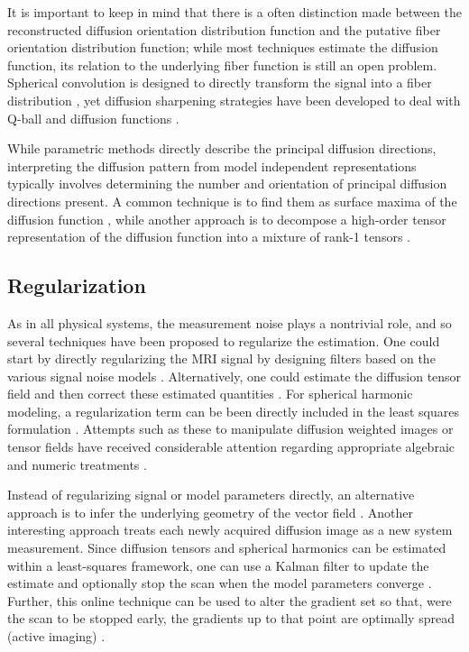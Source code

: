 \documentclass[final,hyperref]{gatech-thesis}
\begin{document}
It is important to keep in mind that there is a often distinction made between
the reconstructed diffusion orientation distribution function and the putative
fiber orientation distribution function; while most techniques estimate the
diffusion function, its relation to the underlying fiber function is still an
open problem.  Spherical convolution is designed to directly transform the
signal into a fiber distribution
\cite{Alexander2005ipmi,Jansons2003,Anderson2005,Tournier2004}, yet diffusion
sharpening strategies have been developed to deal with Q-ball and diffusion
functions \cite{Descoteaux2009tmi}.

While parametric methods directly describe the principal diffusion directions,
interpreting the diffusion pattern from model independent representations
typically involves determining the number and orientation of principal
diffusion directions present.  A common technique is to find them as surface
maxima of the diffusion function
\cite{Hess2006,Tournier2004,Bloy2008,Descoteaux2009tmi}, while another approach
is to decompose a high-order tensor representation of the diffusion function
into a mixture of rank-1 tensors \cite{Schultz2008}.


\subsection{Regularization}

As in all physical systems, the measurement noise plays a nontrivial role, and
so several techniques have been proposed to regularize the estimation.  One
could start by directly regularizing the MRI signal by designing filters based
on the various signal noise models
\cite{Koay2006,Assemlal2008,AjaFernandez2008}.  Alternatively, one could
estimate the diffusion tensor field and then correct these estimated
quantities \cite{Tschumperle2002}.  For spherical harmonic modeling, a
regularization term can be been directly included in the least squares
formulation \cite{Hess2006,Descoteaux2007mrm}.
%
Attempts such as these to manipulate diffusion weighted images or tensor
fields have received considerable attention regarding appropriate algebraic
and numeric treatments
\cite{Tschumperle2002,Batchelor2005,Fletcher2007riem,Kindlmann2007miccai}.

Instead of regularizing signal or model parameters directly, an alternative
approach is to infer the underlying geometry of the vector field
\cite{Savadjiev2006}.
%
Another interesting approach treats each newly acquired diffusion image as a
new system measurement.  Since diffusion tensors and spherical harmonics can
be estimated within a least-squares framework, one can use a Kalman filter to
update the estimate and optionally stop the scan when the model parameters
converge \cite{Poupon2008}.  Further, this online technique can be used to
alter the gradient set so that, were the scan to be stopped early, the
gradients up to that point are optimally spread (active imaging)
\cite{Deriche2009}.
\end{document}

